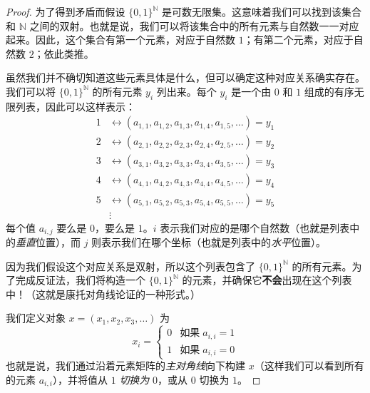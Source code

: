 \begin{proof}
    为了得到矛盾而假设 $\{0, 1\}^{\mathbb{N}}$ 是可数无限集。这意味着我们可以找到该集合和 $\mathbb{N}$ 之间的双射。也就是说，我们可以将该集合中的所有元素与自然数一一对应起来。因此，这个集合有第一个元素，对应于自然数 $1$；有第二个元素，对应于自然数 $2$；依此类推。

    虽然我们并不确切知道这些元素具体是什么，但可以确定这种对应关系确实存在。我们可以将 $\{0, 1\}^{\mathbb{N}}$ 的所有元素 $y_i$ 列出来。每个 $y_i$ 是一个由 $0$ 和 $1$ 组成的有序无限列表，因此可以这样表示：
    \begin{align*}
        1 & \leftrightarrow (a_{1,1} , a_{1,2} , a_{1,3} , a_{1,4} , a_{1,5} , \dots) = y_1 \\
        2 & \leftrightarrow (a_{2,1} , a_{2,2} , a_{2,3} , a_{2,4} , a_{2,5} , \dots) = y_2 \\
        3 & \leftrightarrow (a_{3,1} , a_{3,2} , a_{3,3} , a_{3,4} , a_{3,5} , \dots) = y_3 \\
        4 & \leftrightarrow (a_{4,1} , a_{4,2} , a_{4,3} , a_{4,4} , a_{4,5} , \dots) = y_4 \\
        5 & \leftrightarrow (a_{5,1} , a_{5,2} , a_{5,3} , a_{5,4} , a_{5,5} , \dots) = y_5 \\
          & \vdots
    \end{align*}
    每个值 $a_{i,j}$ 要么是 $0$，要么是 $1$。$i$ 表示我们对应的是哪个自然数（也就是列表中的\emph{垂直}位置），而 $j$ 则表示我们在哪个坐标（也就是列表中的\emph{水平}位置）。

    因为我们假设这个对应关系是双射，所以这个列表包含了 $\{0, 1\}^{\mathbb{N}}$ 的所有元素。为了完成反证法，我们将构造一个 $\{0, 1\}^{\mathbb{N}}$ 的元素，并确保它\textbf{不会}出现在这个列表中！（这就是康托对角线论证的一种形式。）

    我们定义对象 $x = (x_1, x_2, x_3, \dots)$ 为
    \[x_i = \begin{cases}
            0 & \text{如果}\; a_{i,i} = 1 \\
            1 & \text{如果}\; a_{i,i} = 0
        \end{cases}\]
    也就是说，我们通过沿着元素矩阵的\emph{主对角线}向下构建 $x$（这样我们可以看到所有的元素 $a_{i,i}$），并将值从 $1$ \emph{切换为} $0$，或从 $0$ 切换为 $1$。


\end{proof}
